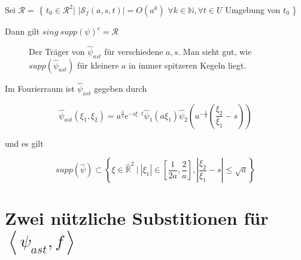 \begin{corollary}
Sei $\mathcal{R} =$ \{
    $t_0 \in \mathcal{R}^2 \big|$ $|\mathcal{S}_f(a,s,t)| = O(a^k)$
    $\forall k \in \mathbb{N}, \forall t \in U$ Umgebung von $t_0$
    \}

    Dann gilt $sing ~supp (\psi)^c = \mathcal{R}$
\end{corollary}

\begin{remark}

\begin{figure}[h]
\centering

\label{fig:supp_psi_hat}
\caption{Der Träger von $\hat \psi_{ast}$ für verschiedene $a, s$. Man sieht gut,
wie $supp (\hat \psi_{ast})$ für kleinere $a$ in immer spitzeren Kegeln liegt.}
\end{figure}

\label{cor:psi_hat}
Im Fourierraum ist $\hat{\psi}_{ast}$ gegeben durch

\begin{equation}
    \hat \psi_{ast}{(\xi_1, \xi_2)} = a^{\frac{3}{4}}e^{-i\xi \cdot t}\hat\psi_1(a \xi_1) \hat\psi_{2}\left(a^{-\frac{1}{2}}\left(\frac{\xi_2}{\xi_1}-s\right)\right)
\label{eq:hat_psi_ast}
\end{equation}

und es gilt

\begin{equation}
\label{eq:supp_psi}
    supp(\hat \psi) \subset \left\{\xi \in  \hat{\mathbb{R}}^2 ~\Big| ~|\xi_1| \in \left[\frac{1}{2 a} , \frac{2}{a}\right], \left|\frac{\xi_2}{\xi_1} - s\right| \leq \sqrt{a} \right\}
\end{equation}

\end{remark}





\section{\texorpdfstring{Zwei nützliche Substitionen für  $\left<\psi_{ast}, f\right>$}{zwei nützliche Substitutionen}}
\label{sec:substitutionen}


